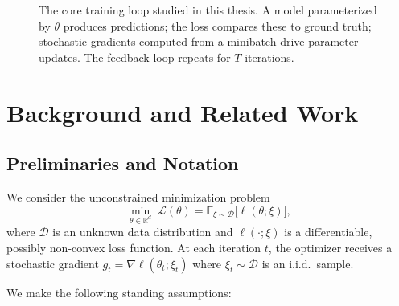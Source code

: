 \documentclass[11pt,twoside,openright]{book}
\begin{document}
\begin{figure}[tb]
  \centering
  \caption{The core training loop studied in this thesis. A model parameterized by $\theta$
    produces predictions; the loss compares these to ground truth; stochastic gradients computed
    from a minibatch drive parameter updates. The feedback loop repeats for $T$ iterations.}
  \label{fig:training_loop}
\end{figure}


\chapter{Background and Related Work}

\section{Preliminaries and Notation}

We consider the unconstrained minimization problem
\begin{equation}
  \min_{\theta \in \mathbb{R}^d}\; \mathcal{L}(\theta)
    = \mathbb{E}_{\xi \sim \mathcal{D}}\bigl[\ell(\theta;\xi)\bigr],
  \label{eq:expected_loss}
\end{equation}
where $\mathcal{D}$ is an unknown data distribution and $\ell(\cdot;\xi)$ is a differentiable,
possibly non-convex loss function. At each iteration $t$, the optimizer receives a stochastic
gradient $g_t = \nabla\ell(\theta_t; \xi_t)$ where $\xi_t \sim \mathcal{D}$ is an i.i.d.\ sample.

We make the following standing assumptions:
\end{document}
